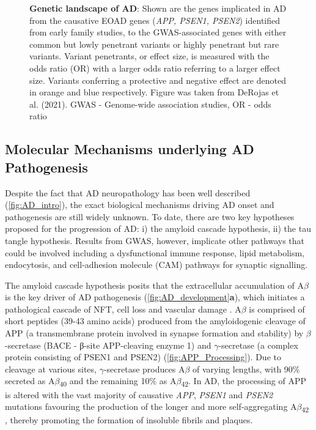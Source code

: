 \begin{landscape}
\begin{figure}[!htp]
		\caption[Genetic landscape of AD]%
		{\textbf{Genetic landscape of AD}: Shown are the genes implicated in AD from the causative EOAD genes (\textit{APP, PSEN1, PSEN2}) identified from early family studies, to the GWAS-associated genes with either common but lowly penetrant variants or highly penetrant but rare variants. Variant penetrants, or effect size, is measured with the odds ratio (OR) with a larger odds ratio referring to a larger effect size. Variants conferring a protective and negative effect are denoted in orange and blue respectively. Figure was taken from DeRojas et al. (2021)\cite{DeRojas2021}. GWAS - Genome-wide association studies, OR - odds ratio
		}
		\label{fig:AD_gwas}
	\end{figure}
\end{landscape}

\subsection{Molecular Mechanisms underlying AD Pathogenesis}
\label{aetiologyAD}
Despite the fact that AD neuropathology has been well described (\cref{fig:AD_intro}), the exact biological mechanisms driving AD onset and pathogenesis are still widely unknown. To date, there are two key hypotheses proposed for the progression of AD: i) the amyloid cascade hypothesis, ii) the tau tangle hypothesis. Results from GWAS, however, implicate other pathways that could be involved including a dysfunctional immune response, lipid metabolism, endocytosis, and cell-adhesion molecule (CAM) pathways for synaptic signalling.  

The amyloid cascade hypothesis posits that the extracellular accumulation of A$\beta$ is the key driver of AD pathogenesis (\cref{fig:AD_development}\textbf{a}), which initiates a pathological cascade of NFT, cell loss and vascular damage \cite{Hardy1992}. A$\beta$ is comprised of short peptides (39-43 amino acids) \cite{J1987} produced from the amyloidogenic cleavage of APP (a transmembrane protein involved in synapse formation and stability) by $\beta$-secretase (BACE - β-site APP-cleaving enzyme 1) and $\gamma$-secretase (a complex protein consisting of PSEN1 and PSEN2) (\cref{fig:APP_Processing}). Due to cleavage at various sites, $\gamma$-secretase produces A$\beta$ of varying lengths, with 90\% secreted as A$\beta$\textsubscript{40} and the remaining 10\% as A$\beta$\textsubscript{42}\cite{Asami-Odaka1995}. In AD, the processing of APP is altered with the vast majority of causative \textit{APP}, \textit{PSEN1} and \textit{PSEN2} mutations favouring the production of the longer and more self-aggregating A$\beta$\textsubscript{42} \cite{Li2019,D1996,JT1993}, thereby promoting the formation of insoluble fibrils and plaques\cite{JT1993}. 

